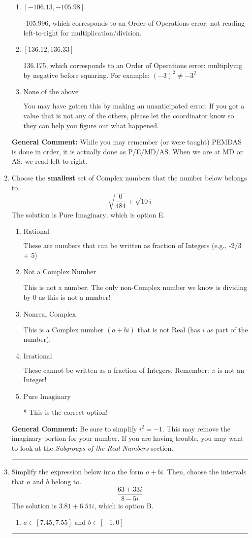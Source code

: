 \documentclass{extbook}[14pt]
\newcommand{\litem}[1]{\item #1

\rule{\textwidth}{0.4pt}}
\begin{document}
\begin{enumerate}
{\begin{enumerate}[label=\Alph*.]
* -105.825, this is the correct option
\item \( [-106.13, -105.98] \)

 -105.996, which corresponds to an Order of Operations error: not reading left-to-right for multiplication/division.
\item \( [136.12, 136.33] \)

 136.175, which corresponds to an Order of Operations error: multiplying by negative before squaring. For example: $(-3)^2 \neq -3^2$
\item \( \text{None of the above} \)

 You may have gotten this by making an unanticipated error. If you got a value that is not any of the others, please let the coordinator know so they can help you figure out what happened.
\end{enumerate}

\textbf{General Comment:} While you may remember (or were taught) PEMDAS is done in order, it is actually done as P/E/MD/AS. When we are at MD or AS, we read left to right.
}
\litem{
Choose the \textbf{smallest} set of Complex numbers that the number below belongs to.
\[ \sqrt{\frac{0}{484}}+\sqrt{10}i \]The solution is \( \text{Pure Imaginary} \), which is option E.\begin{enumerate}[label=\Alph*.]
\item \( \text{Rational} \)

These are numbers that can be written as fraction of Integers (e.g., -2/3 + 5)
\item \( \text{Not a Complex Number} \)

This is not a number. The only non-Complex number we know is dividing by 0 as this is not a number!
\item \( \text{Nonreal Complex} \)

This is a Complex number $(a+bi)$ that is not Real (has $i$ as part of the number).
\item \( \text{Irrational} \)

These cannot be written as a fraction of Integers. Remember: $\pi$ is not an Integer!
\item \( \text{Pure Imaginary} \)

* This is the correct option!
\end{enumerate}

\textbf{General Comment:} Be sure to simplify $i^2 = -1$. This may remove the imaginary portion for your number. If you are having trouble, you may want to look at the \textit{Subgroups of the Real Numbers} section.
}
\litem{
Simplify the expression below into the form $a+bi$. Then, choose the intervals that $a$ and $b$ belong to.
\[ \frac{63 + 33 i}{8 - 5 i} \]The solution is \( 3.81  + 6.51 i \), which is option B.\begin{enumerate}[label=\Alph*.]
\item \( a \in [7.45, 7.55] \text{ and } b \in [-1, 0] \)


\end{enumerate}}
\end{enumerate}
\end{document}
